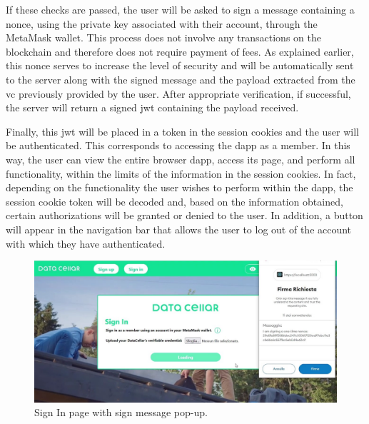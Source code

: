 

\newpage

If these checks are passed, the user will be asked to sign a message containing a \gls{nonce}, using the private key associated with their account, through the MetaMask wallet. 
This process does not involve any transactions on the blockchain and therefore does not require payment of fees. As explained earlier, this \gls{nonce} serves to increase the 
level of security and will be automatically sent to the server along with the signed message and the payload extracted from the \gls{vc} previously provided by the user. After 
appropriate verification, if successful, the server will return a signed \gls{jwt} containing the payload received.

Finally, this \gls{jwt} will be placed in a token in the session cookies and the user will be authenticated. This corresponds to accessing the \gls{dapp} as a member. In this 
way, the user can view the entire browser \gls{dapp}, access its page, and perform all functionality, within the limits of the information in the session cookies. In fact, 
depending on the functionality the user wishes to perform within the \gls{dapp}, the session cookie token will be decoded and, based on the information obtained, certain 
authorizations will be granted or denied to the user. In addition, a button will appear in the navigation bar that allows the user to log out of the account with which they have authenticated.

\begin{figure}[h]  
  \centering
  \includegraphics[width=1\textwidth]{Images/c6_3.jpg} 
  \caption{Sign In page with sign message pop-up.}
\end{figure}

